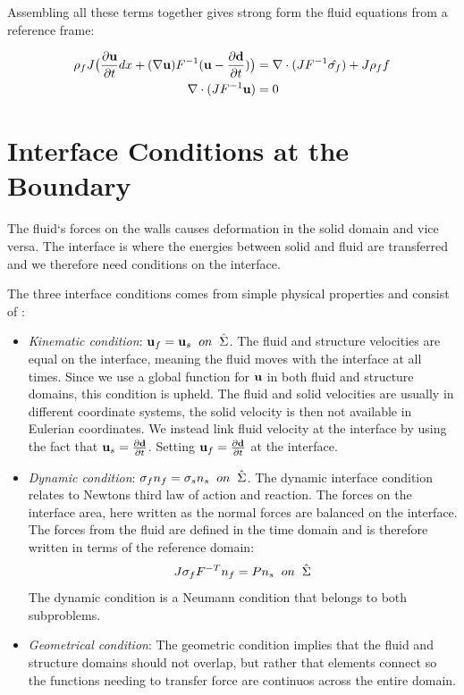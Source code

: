 Assembling all these terms together gives strong form the fluid equations from a reference frame:

\begin{align}
\label{eq:NS_mapped}
\rho_f J \big( \frac{\partial \bold{u}}{\partial t} dx + (\nabla \bold{u})F^{-1}(\bold{u}-\frac{\partial \bold{d}}{\partial t}) \big) &= \nabla \cdot( J F^{-1} \hat{\sigma_f} ) + J \rho_f f  \\
\nabla \cdot (J F^{-1} \bold{u} ) &= 0
\end{align} 

\section{Interface Conditions at the Boundary}
The fluid`s forces on the walls causes deformation in the solid domain and vice versa. The interface is where the energies between solid and fluid are transferred and we therefore need conditions on the interface. \newline

The three interface conditions comes from simple physical properties and consist of \cite{Richter2010}:
\begin{itemize}
\item \textit{Kinematic condition}: $\bold{u}_f = \bold{u}_s  \hspace{2mm} on \hspace{2mm} \hat{\Sigma}$. The fluid and structure velocities are equal on the interface, meaning the fluid moves with the interface at all times. 
Since we use a global function for $\bold{u}$ in both fluid and structure domains, this condition is upheld.
The fluid and solid velocities are usually in different coordinate systems, the solid velocity is then not available in Eulerian coordinates. We instead link fluid velocity at the interface by using the fact that $\bold{u}_s = \frac{\partial \bold{d}}{\partial t}$. Setting $\bold{u}_f = \frac{\partial \bold{d}}{\partial t}$ at the interface.

\item \textit{Dynamic condition}: $  \sigma_f n_f = \sigma_s n_s \hspace{2mm} on  \hspace{2mm}\hat{\Sigma}   $. 
	The dynamic interface condition relates to Newtons third law of action and reaction. The forces on the interface area, here written as the normal forces are balanced on the interface. The forces from the fluid are defined in the time domain and is therefore written in terms of the reference domain: 
	$$J\sigma_f F^{-T} n_f = P n_s \hspace{2mm} on  \hspace{2mm}\hat{\Sigma} $$
	The dynamic condition is a Neumann condition that belongs to both subproblems.
	
\item \textit{Geometrical condition}: The geometric condition implies that the fluid and structure domains should not overlap, but rather that elements connect so the functions needing to transfer force are continuos across the entire domain.
\end{itemize}

